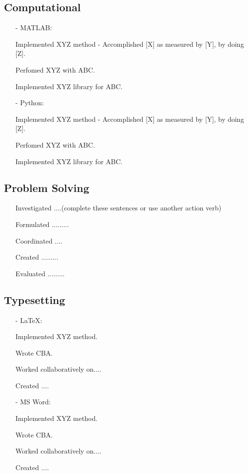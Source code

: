 \documentclass[11pt]{article}
\begin{document}
    \subsection{Computational}
    \begin{itemize}
        \item[-] \textcolor{Sepia}{MATLAB}:
        \item[\checkmark] Implemented XYZ method - Accomplished [X] as measured by [Y], by doing [Z].  
        \item[\checkmark] Perfomed XYZ with ABC. 
        \item[\checkmark] Implemented XYZ library for ABC. 
        \item[-] \textcolor{Sepia}{Python}: 
        \item[\checkmark] Implemented XYZ method - Accomplished [X] as measured by [Y], by doing [Z].  
        \item[\checkmark] Perfomed XYZ with ABC. 
        \item[\checkmark] Implemented XYZ library for ABC.
    \end{itemize}
    \subsection{Problem Solving}
    \begin{itemize}
        \item[\checkmark] Investigated ....(complete these sentences or use another action verb)
        \item[\checkmark] Formulated .........
        \item[\checkmark] Coordinated ....
        \item[\checkmark] Created .........
        \item[\checkmark] Evaluated .........
    \end{itemize}
    \subsection{Typesetting}
    \begin{itemize}
        \item[-] \textcolor{Sepia}{\LaTeX}: 
        \item[\checkmark] Implemented XYZ method. 
        \item[\checkmark] Wrote CBA. 
        \item[\checkmark] Worked collaboratively on.... 
        \item[\checkmark] Created ....
        \item[-] \textcolor{Sepia}{MS Word}:  
        \item[\checkmark] Implemented XYZ method. 
        \item[\checkmark] Wrote CBA. 
        \item[\checkmark] Worked collaboratively on.... 
        \item[\checkmark] Created ....
    \end{itemize}
\end{document}

